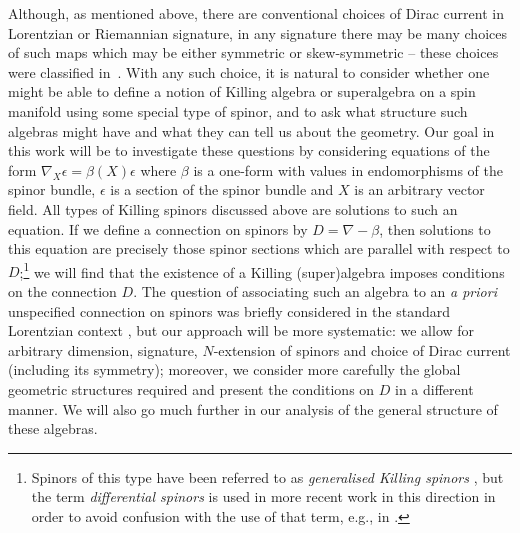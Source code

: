 \documentclass[pdftex]{sigma}
\numberwithin{equation}{section}
\newcommand{\1}{\mathbbm{1}}
\begin{document}
Although, as mentioned above, there are conventional choices of Dirac current in Lorentzian or Riemannian signature, in any signature there may be many choices of such maps which may be either symmetric or skew-symmetric -- these choices were classified in~\cite{Alekseevsky1997}. With any such choice, it is natural to consider whether one might be able to define a notion of Killing algebra or superalgebra on a spin manifold using some special type of spinor, and to ask what structure such algebras might have and what they can tell us about the geometry. Our goal in this work will be to investigate these questions by considering equations of the form
$\nabla_X \epsilon = \beta(X) \epsilon
$
where $\beta$ is a one-form with values in endomorphisms of the spinor bundle, $\epsilon$ is a section of the spinor bundle and $X$ is an arbitrary vector field. All types of Killing spinors discussed above are solutions to such an equation. If we define a connection on spinors by $D=\nabla-\beta$, then solutions to this equation are precisely those spinor sections which are parallel with respect to $D$;\footnote{Spinors of this type have been referred to as \emph{generalised Killing spinors} \cite{Cortes2021,Lazaroiu2016}, but the term \emph{differential spinors} is used in more recent work in this direction \cite{Shahbazi2024_2,Shahbazi2024_1} in order to avoid confusion with the use of that term, e.g., in \cite{Bar2005,Moroianu2014}.}
we will find that the existence of a Killing (super)algebra imposes conditions on the connection $D$. The question of associating such an algebra to an \textit{a priori} unspecified connection on spinors was briefly considered in the standard Lorentzian context \cite{Hustler2016}, but our approach will be more systematic: we allow for arbitrary dimension, signature, $N$-extension of spinors and choice of Dirac current (including its symmetry); moreover, we consider more carefully the global geometric structures required and present the conditions on $D$ in a different manner. We will also go much further in our analysis of the general structure of these algebras.
\end{document}
